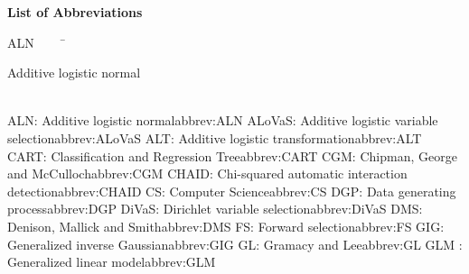  
 
 
 
 
{\Huge\textbf{List of Abbreviations}}
\begin{tabbing}
ALN~~~~~\=\parbox{6in}{\hspace{.4in}Additive logistic normal\dotfill \pageref{abbrev:ALN}}\\
\addabbrev ALN: {\hspace{.4in}Additive logistic normal}{abbrev:ALN}
\addabbrev ALoVaS: {\hspace{.4in}Additive logistic variable selection}{abbrev:ALoVaS}
\addabbrev ALT: {\hspace{.4in}Additive logistic transformation}{abbrev:ALT}
\addabbrev CART: {\hspace{.4in}Classification and Regression Tree}{abbrev:CART}
\addabbrev CGM: {\hspace{.4in}Chipman, George and McCulloch}{abbrev:CGM}
\addabbrev CHAID: {\hspace{.4in}Chi-squared automatic interaction detection}{abbrev:CHAID}
\addabbrev CS: {\hspace{.4in}Computer Science}{abbrev:CS}
\addabbrev DGP: {\hspace{.4in}Data generating process}{abbrev:DGP}
\addabbrev DiVaS: {\hspace{.4in}Dirichlet variable selection}{abbrev:DiVaS}
\addabbrev DMS: {\hspace{.4in}Denison, Mallick and Smith}{abbrev:DMS}
\addabbrev FS: {\hspace{.4in}Forward selection}{abbrev:FS}
\addabbrev GIG: {\hspace{.4in}Generalized inverse Gaussian}{abbrev:GIG}
\addabbrev GL: {\hspace{.4in}Gramacy and Lee}{abbrev:GL}
\addabbrev GLM : {\hspace{.4in}Generalized linear model}{abbrev:GLM}

\end{tabbing}
